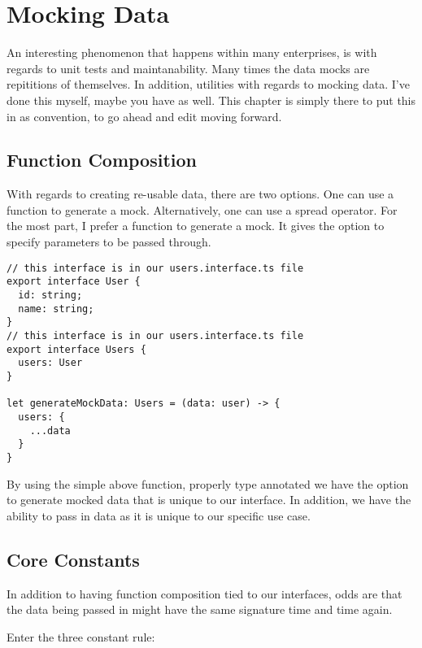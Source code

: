 \maketitle{}
\section{ Mocking Data }
An interesting phenomenon that happens within many enterprises, is with regards
to unit tests and maintanability. Many times the data mocks are repititions of
themselves. In addition, utilities with regards to mocking data. I've done this
myself, maybe you have as well. This chapter is simply there to put this in as
convention, to go ahead and edit moving forward.

\subsection{ Function Composition }
With regards to creating re-usable data, there are two options. One can use a
function to generate a mock. Alternatively, one can use a spread operator. For
the most part, I prefer a function to generate a mock. It gives the option to
specify parameters to be passed through.

\begin{lstlisting}
// this interface is in our users.interface.ts file
export interface User {
  id: string;
  name: string;
}
// this interface is in our users.interface.ts file
export interface Users {
  users: User
}

let generateMockData: Users = (data: user) -> {
  users: {
    ...data
  }
}
\end{lstlisting}

By using the simple above function, properly type annotated we have the option
to generate mocked data that is unique to our interface. In addition, we have
the ability to pass in data as it is unique to our specific use case.

\subsection{ Core Constants }
In addition to having function composition tied to our interfaces, odds are that
the data being passed in might have the same signature time and time again.

Enter the three constant rule:
